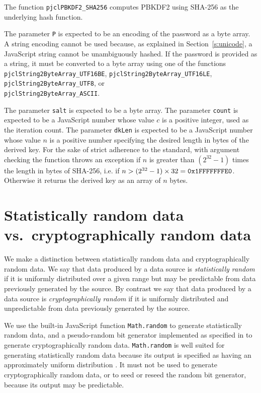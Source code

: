 \documentclass[12pt]{article}
\begin{document}
The function {\tt pjclPBKDF2\_SHA256} computes PBKDF2 using SHA-256 as the
underlying hash function.  

The parameter {\tt P} is expected to be an encoding
of the password as a byte array.  A string encoding cannot be used because, as
explained in Section~\ref{s:unicode}, a JavaScript string cannot be unambiguously hashed.
If the password is provided as a string, it must be converted to a byte array 
using one of the functions
{\tt pjclString2ByteArray\_UTF16BE},
{\tt pjclString2ByteArray\_UTF16LE},
{\tt pjclString2ByteArray\_UTF8}, or\\
{\tt pjclString2ByteArray\_ASCII}.

The parameter {\tt salt} is expected to be a byte array.  The parameter
{\tt count} is expected to be a JavaScript number whose value $c$ is
a positive integer, used as the iteration count.  The parameter {\tt  dkLen}
is expected to be
a JavaScript number whose value $n$ is a positive number specifying the desired length
in bytes of the derived key.  For the sake of strict adherence to the standard,
with argument checking the function throws an exception if 
$n$ is greater than $(2^{32} - 1)$ times the length in bytes of SHA-256,
i.e. if $n > (2^{32} - 1)\times 32 = \mbox{\tt 0x1FFFFFFFE0}$. Otherwise
it returns the derived key as an array of $n$ bytes.

\section{Statistically random data vs.\ cryptographically random data}

We make a distinction between statistically random data and
cryptographically random data.  We say that data produced by a data
source is {\em statistically random\/} if it is uniformly distributed
over a given range but may be predictable from data previously
generated by the source.  By contrast we say that data produced by a
data source is {\em cryptographically random\/} if it is uniformly
distributed and unpredictable from data previously generated by the
source.

We use the built-in JavaScript function {\tt Math.random} to generate
statistically random data, and a pseudo-random bit generator
implemented as specified in \cite[\S~10.1.1]{SP800-90Ar1} to generate
cryptographically random data.  {\tt Math.random} is well suited for generating statistically random data because its output is specified as having an approximately uniform distribution
\cite[15.8.2.14]{ecmascript51}.  It must not be used to
generate cryptographically random data, or to seed or reseed the random
bit generator, because its output may be predictable. 
\end{document}
